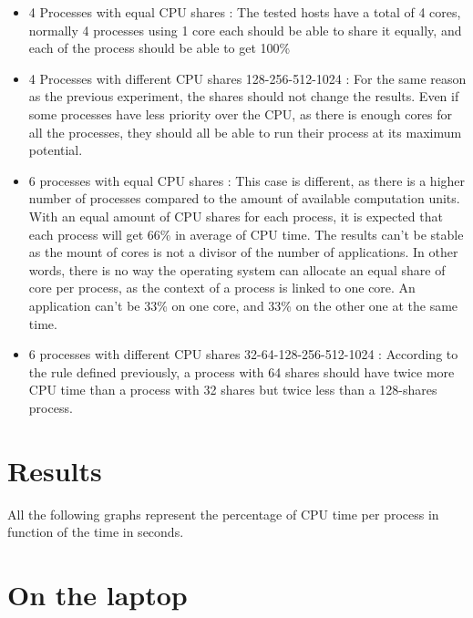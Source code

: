 \begin{itemize}
\item{4 Processes with equal CPU shares : \newline The tested hosts
	have a total of 4 cores, normally 4 processes using 1 core each should
	be able to share it equally, and each of the process should be able to
	get 100\%
}
\item{4 Processes with different CPU shares 128-256-512-1024 : \newline
	For the same reason as the previous experiment, the
	shares should not change the results. Even if some processes have less
	priority over the CPU, as there is enough cores for all the processes,
	they should all be able to run their process at its maximum potential.
}
\item{6 processes with equal CPU shares : \newline This case is
	different, as there is a higher number of processes compared to the
	amount of available computation units. With an equal amount of CPU
	shares for each process, it is expected that each process will get 66\%
	in average of CPU time.  The results can't be stable as the mount of
	cores is not a divisor of the number of applications. In other words,
	there is no way the operating system can allocate an equal share of
	core per process, as the context of a process is linked to one core. An
	application can't be 33\% on one core, and 33\% on the other one at the
	same time.
}
\item{6 processes with different CPU shares 32-64-128-256-512-1024 : \newline
	According to the rule defined previously, a process with 64 shares
	should have twice more CPU time than a process with 32 shares but twice
	less than a 128-shares process.
}
\end{itemize}

\section{Results}

All the following graphs represent the percentage of CPU time per process
in function of the time in seconds.

\section{On the laptop}

